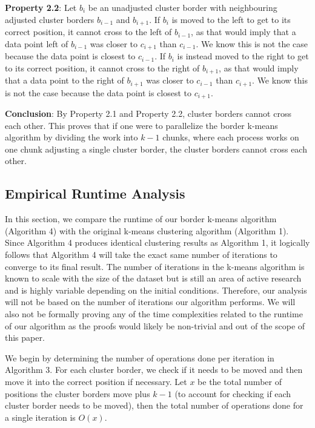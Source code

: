 \documentclass[conference,compsoc]{IEEEtran}
\begin{document}
\textbf{Property 2.2}: Let $b_i$ be an unadjusted cluster border with neighbouring adjusted cluster borders $b_{i-1}$ and $b_{i+1}$. If $b_i$ is moved to the left to get to its correct position, it cannot cross to the left of $b_{i-1}$, as that would imply that a data point left of $b_{i-1}$ was closer to $c_{i+1}$ than $c_{i-1}$. We know this is not the case because the data point is closest to $c_{i-1}$. If $b_i$ is instead moved to the right to get to its correct position, it cannot cross to the right of $b_{i+1}$, as that would imply that a data point to the right of $b_{i+1}$ was closer to $c_{i-1}$ than $c_{i+1}$. We know this is not the case because the data point is closest to $c_{i+1}$.

\textbf{Conclusion}: By Property 2.1 and Property 2.2, cluster borders cannot cross each other. This proves that if one were to parallelize the border k-means algorithm by dividing the work into $k-1$ chunks, where each process works on one chunk adjusting a single cluster border, the cluster borders cannot cross each other.


\subsection{Empirical Runtime Analysis}

In this section, we compare the runtime of our border k-means algorithm (Algorithm 4) with the original k-means clustering algorithm (Algorithm 1). Since Algorithm 4 produces identical clustering results as Algorithm 1, it logically follows that Algorithm 4 will take the exact same number of iterations to converge to its final result. The number of iterations in the k-means algorithm is known to scale with the size of the dataset \cite{b7} but is still an area of active research and is highly variable depending on the initial conditions. Therefore, our analysis will not be based on the number of iterations our algorithm performs. We will also not be formally proving any of the time complexities related to the runtime of our algorithm as the proofs would likely be non-trivial and out of the scope of this paper.

We begin by determining the number of operations done per iteration in Algorithm 3. For each cluster border, we check if it needs to be moved and then move it into the correct position if necessary. Let $x$ be the total number of positions the cluster borders move plus $k-1$ (to account for checking if each cluster border needs to be moved), then the total number of operations done for a single iteration is $O(x)$.
\end{document}
